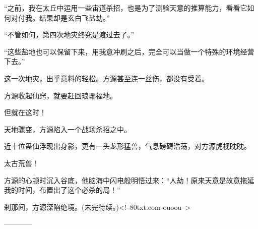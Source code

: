 \begin{this_body}
“之前，我在太丘中运用一些宙道杀招，也是为了测验天意的推算能力，看看它如何对付我。结果却是玄白飞盐劫。”

“不管如何，第四次地灾终究是渡过去了。”

“这些盐地也可以保留下来，用我意冲刷之后，完全可以当做一个特殊的环境经营下去。”

这一次地灾，出乎意料的轻松。方源甚至连一丝伤，都没有受着。

方源收起仙窍，就要赶回琅琊福地。

但就在这时！

天地骤变，方源陷入一个战场杀招之中。

近十位蛊仙浮现出身影，更有一头龙形猛兽，气息磅礴浩荡，对方源虎视眈眈。

太古荒兽！

方源的心顿时沉入谷底，他脑海中闪电般明悟过来：“人劫！原来天意是故意拖延我的时间，布置出了这个必杀的局！”

刹那间，方源深陷绝境。(未完待续。)<!--80txt.com-ouoou-->

------------

\end{this_body}

